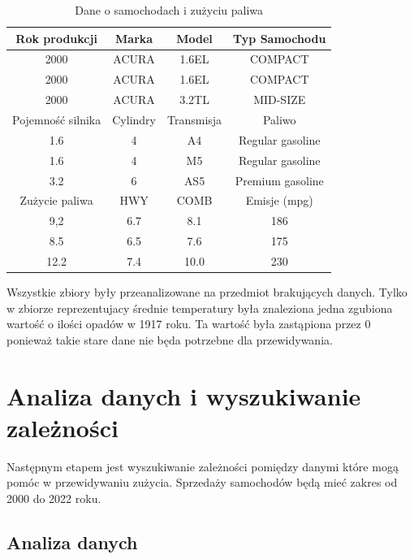 \documentclass[9pt,a4paper,twoside]{rho}
\begin{document}
            \begin{table}[ht]
            \centering
            \caption{Dane o samochodach i zużyciu paliwa}
            \label{tab:vehicle_data}
            \begin{tabular}{cccc}
            \toprule
            Rok produkcji & Marka & Model & Typ Samochodu \\
            \midrule
            2000 & ACURA & 1.6EL & COMPACT \\	
            2000 & ACURA & 1.6EL & COMPACT \\
            2000 & ACURA & 3.2TL & MID-SIZE \\
            \midrule
            Pojemność silnika & Cylindry & Transmisja & Paliwo \\
            \midrule
            1.6 & 4 & A4 & Regular gasoline	\\
            1.6 & 4 & M5 & Regular gasoline \\
            3.2 & 6 & AS5 & Premium gasoline \\
            \midrule
            Zużycie paliwa & HWY & COMB & Emisje (mpg) \\
            \midrule
            9,2 & 6.7 & 8.1 & 186 \\
            8.5 & 6.5 & 7.6 & 175 \\
            12.2 & 7.4 & 10.0 & 230 \\
            \bottomrule
            \end{tabular}
            \end{table}
            
        Wszystkie zbiory były przeanalizowane na przedmiot brakujących danych. Tylko w zbiorze reprezentujacy średnie temperatury była znaleziona jedna zgubiona wartość o ilości opadów w 1917 roku. Ta wartość była zastąpiona przez 0 ponieważ takie stare dane nie będa potrzebne dla przewidywania.

\section*{Analiza danych i wyszukiwanie zależności}
    Następnym etapem jest wyszukiwanie zależności pomiędzy danymi które mogą pomóc w przewidywaniu zużycia. Sprzedaży samochodów będą mieć zakres od 2000 do 2022 roku.
    \subsection*{Analiza danych}
\end{document}
